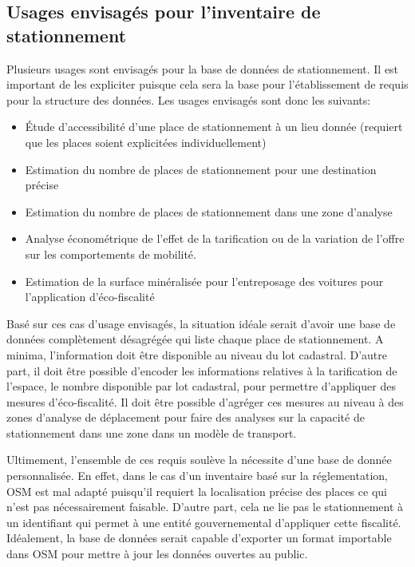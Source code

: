     \subsection{Usages envisagés pour l'inventaire de stationnement}
    Plusieurs usages sont envisagés pour la base de données de stationnement. Il est important de les expliciter puisque cela sera la base pour l'établissement de requis pour la structure des données. Les usages envisagés sont donc les suivants:
    \begin{itemize}
        \item Étude d'accessibilité d'une place de stationnement à un lieu donnée (requiert que les places soient explicitées individuellement)
        \item Estimation du nombre de places de stationnement pour une destination précise
        \item Estimation du nombre de places de stationnement dans une zone d'analyse
        \item Analyse économétrique de l'effet de la tarification ou de la variation de l'offre sur les comportements de mobilité.
        \item Estimation de la surface minéralisée pour l'entreposage des voitures pour l'application d'éco-fiscalité   
    \end{itemize}
    Basé sur ces cas d'usage envisagés, la situation idéale serait d'avoir une base de données complètement désagrégée qui liste chaque place de stationnement. A minima, l'information doit être disponible au niveau du lot cadastral. D'autre part, il doit être possible d'encoder les informations relatives à la tarification de l'espace, le nombre disponible par lot cadastral, pour permettre d'appliquer des mesures d'éco-fiscalité. Il doit être possible d'agréger ces mesures au niveau à des zones d'analyse de déplacement pour faire des analyses sur la capacité de stationnement dans une zone dans un modèle de transport. \par
    Ultimement, l'ensemble de ces requis soulève la nécessite d'une base de donnée personnalisée. En effet, dans le cas d'un inventaire basé sur la réglementation, \ac{OSM} est mal adapté puisqu'il requiert la localisation précise des places ce qui n'est pas nécessairement faisable. D'autre part, cela ne lie pas le stationnement à un identifiant qui permet à une entité gouvernemental d'appliquer cette fiscalité. Idéalement, la base de données serait capable d'exporter un format importable dans \ac{OSM} pour mettre à jour les données ouvertes au public.

